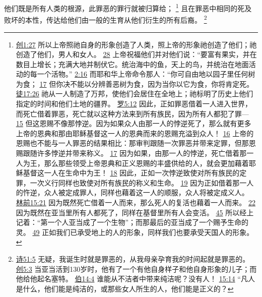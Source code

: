 \documentclass[12pt, a4paper, oneside]{ctexart}
\newcounter{parnum}[section]
\newcommand{\N}{%
   \noindent\refstepcounter{parnum}%
    \makebox[\parindent][l]{\textbf{\arabic{parnum}.}}}
\begin{document}
\N 他们既是所有人类的根源，此罪恶的罪行就被归算给；
	\footnote {
		\href{https://biblehub.com/genesis/1-27.htm}{创1:27} 所以上帝照祂自身的形象创造了人类，照上帝的形象祂创造了他们；祂创造了他们，男人和女人。
		\href{https://biblehub.com/genesis/1-28.htm}{28} 上帝祝福他们并对他们说：“要富有果实，并在数目上增长；充满大地并制伏它。统治海中的鱼，天上的鸟，并统治在地面活动的每一个活物。”
        \href{https://biblehub.com/genesis/2-16.htm}{2:16} 而耶和华上帝命令那人：“你可自由地以园子里任何树为食；
		\href{https://biblehub.com/genesis/2-17.htm}{17} 但你决不能以分辨善恶树为食，因为当你以它为食，你将肯定死。
		\href{https://biblehub.com/acts/17-26.htm}{徒17:26} 祂从一人制造了万邦，使他们会居住在全地上；祂标明了历史上他们指定的时间和他们土地的疆界。
		\href{https://biblehub.com/romans/5-12.htm}{罗5:12} 因此，正如罪恶借着一人进入世界，而死亡借着罪恶，死亡就以这种方法来到所有族民，因为所有人都犯了罪---
		\href{https://biblehub.com/romans/5-15.htm}{15} 但这恩赐不像那悖逆。因为如果众人由那一人的悖逆死了，那么就有更多上帝的恩典和那由耶稣基督这一人的恩典而来的恩赐充溢到众人！
		\href{https://biblehub.com/romans/5-16.htm}{16} 上帝的恩赐也不能与一人罪恶的结果相比：那审判跟随一次罪恶并带来定罪，但那恩赐跟随许多悖逆并带来称义。
		\href{https://biblehub.com/romans/5-17.htm}{17} 因为如果，由那一人的悖逆，死亡借着那一人为王，那么那些领受上帝恩典和正义恩赐的丰盛供给的人，就会更加藉着耶稣基督这一人在生命中为王！
		\href{https://biblehub.com/romans/5-18.htm}{18} 因此，正如一次悖逆致使对所有族民的定罪，一次义行同样也致使对所有族民的称义和生命。
		\href{https://biblehub.com/romans/5-19.htm}{19} 因为正如借着那一人的忤逆，众人被定成罪人，同样也藉着这一人的顺服，众人将被定成义人。
		\href{https://biblehub.com/1_corinthians/15-21.htm}{林前15:21} 因为既然死亡借着一人而来，那么死人的复活也藉着一人而来。
		\href{https://biblehub.com/1_corinthians/15-22.htm}{22} 因为既然在亚当里所有人都死了，同样在基督里所有人会变活。
		\href{https://biblehub.com/1_corinthians/15-45.htm}{45} 所以经上记着：“第一个人亚当成了一个生物”；而那最后的亚当成了一个赐予生命的灵。
		\href{https://biblehub.com/1_corinthians/15-49.htm}{49} 正如我们已承受地上的人的形象，同样我们也要承受天国人的形象。
	}
	且在罪恶中相同的死及败坏的本性，传达给他们由一般的生育从他们衍生的所有后裔。
	\footnote {
		\href{https://biblehub.com/psalms/51-5.htm}{诗51:5} 无疑，我诞生时就是罪恶的，从我母亲孕育我的时间起就是罪恶的。
		\href{https://biblehub.com/genesis/5-3.htm}{创5:3} 当亚当活到130岁时，他有了一个有他自身样子和他自身形象的儿子；而他给他起名塞特。
		\href{https://biblehub.com/job/14-4.htm}{伯14:4} 谁能从不洁者中带来纯洁呢？没有人！
		\href{https://biblehub.com/job/15-14.htm}{15:14} “凡人是什么，他们能是纯洁的，或那些女人所生的人，他们能是正义的？
	}
\end{document}
